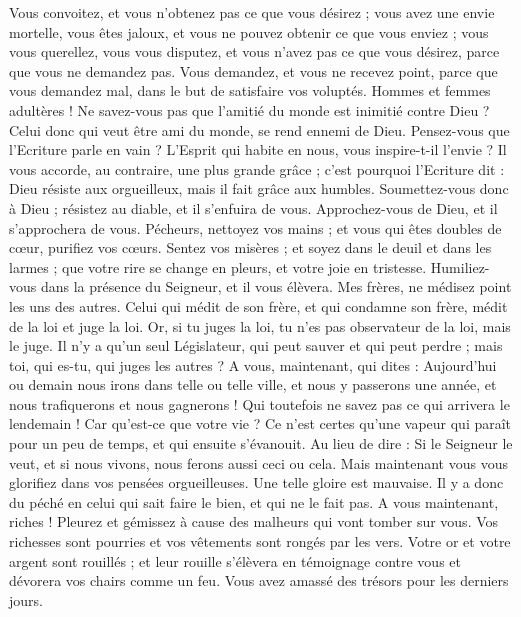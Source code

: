 \begin{multicols}{2}
Vous convoitez, et vous n'obtenez pas ce que vous désirez ; vous avez une envie mortelle, vous êtes jaloux, et vous ne pouvez obtenir ce que vous enviez ; vous vous querellez, vous vous disputez, et vous n'avez pas ce que vous désirez, parce que vous ne demandez pas.
Vous demandez, et vous ne recevez point, parce que vous demandez mal, dans le but de satisfaire vos voluptés.
Hommes et femmes adultères ! Ne savez-vous pas que l'amitié du monde est inimitié contre Dieu ? Celui donc qui veut être ami du monde, se rend ennemi de Dieu.
Pensez-vous que l'Ecriture parle en vain ? L'Esprit qui habite en nous, vous inspire-t-il l'envie ?
Il vous accorde, au contraire, une plus grande grâce ; c'est pourquoi l'Ecriture dit : Dieu résiste aux orgueilleux, mais il fait grâce aux humbles.
Soumettez-vous donc à Dieu ; résistez au diable, et il s'enfuira de vous.
Approchez-vous de Dieu, et il s'approchera de vous. Pécheurs, nettoyez vos mains ; et vous qui êtes doubles de cœur, purifiez vos cœurs.
Sentez vos misères ; et soyez dans le deuil et dans les larmes ; que votre rire se change en pleurs, et votre joie en tristesse.
Humiliez-vous dans la présence du Seigneur, et il vous élèvera.
Mes frères, ne médisez point les uns des autres. Celui qui médit de son frère, et qui condamne son frère, médit de la loi et juge la loi. Or, si tu juges la loi, tu n'es pas observateur de la loi, mais le juge.
Il n'y a qu'un seul Législateur, qui peut sauver et qui peut perdre ; mais toi, qui es-tu, qui juges les autres ?
A vous, maintenant, qui dites : Aujourd'hui ou demain nous irons dans telle ou telle ville, et nous y passerons une année, et nous trafiquerons et nous gagnerons !
Qui toutefois ne savez pas ce qui arrivera le lendemain ! Car qu'est-ce que votre vie ? Ce n'est certes qu'une vapeur qui paraît pour un peu de temps, et qui ensuite s'évanouit.
Au lieu de dire : Si le Seigneur le veut, et si nous vivons, nous ferons aussi ceci ou cela.
Mais maintenant vous vous glorifiez dans vos pensées orgueilleuses. Une telle gloire est mauvaise.
Il y a donc du péché en celui qui sait faire le bien, et qui ne le fait pas.
\VerseOne{}A vous maintenant, riches ! Pleurez et gémissez à cause des malheurs qui vont tomber sur vous.
Vos richesses sont pourries et vos vêtements sont rongés par les vers.
Votre or et votre argent sont rouillés ; et leur rouille s'élèvera en témoignage contre vous et dévorera vos chairs comme un feu. Vous avez amassé des trésors pour les derniers jours.

\end{multicols}

